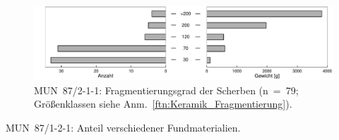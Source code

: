 \begin{figure}[tb]
	\centering
	\includegraphics[width=\textwidth]{fig/9-13_MUN87-211_Fragmentierung_2.pdf}
	\caption{MUN~87/2-1-1: Fragmentierungsgrad der Scherben (n~=~79; Größenklassen siehe Anm.~\ref{ftn:Keramik_Fragmentierung}).}
	\label{fig:MUN87-211_Fragmentierung}
\end{figure}

\begin{table}[tb]
	\centering{\footnotesize }
	\caption{MUN~87/1-2-1: Anteil verschiedener Fundmaterialien.}
	\label{tab:MUN87-2-1-1_Funde}
\end{table}

